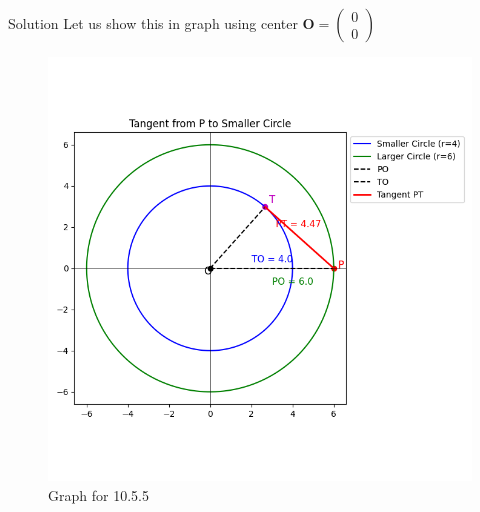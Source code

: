 \documentclass{beamer}
\let\vec\mathbf
\theoremstyle{remark}
\newcommand{\myvec}[1]{\ensuremath{\begin{pmatrix}#1\end{pmatrix}}}
\begin{document}
    \begin{frame}{Solution}
    Let us show this in graph using center $\vec{O}= \myvec{0\\0}$
    \begin{figure}
    \centering
    \includegraphics[width=0.5\columnwidth]{figs/1.png}
    \caption{Graph for 10.5.5}
    \label{fig:placeholder}
\end{figure}
    \end{frame}
    
    
    
\end{document}
